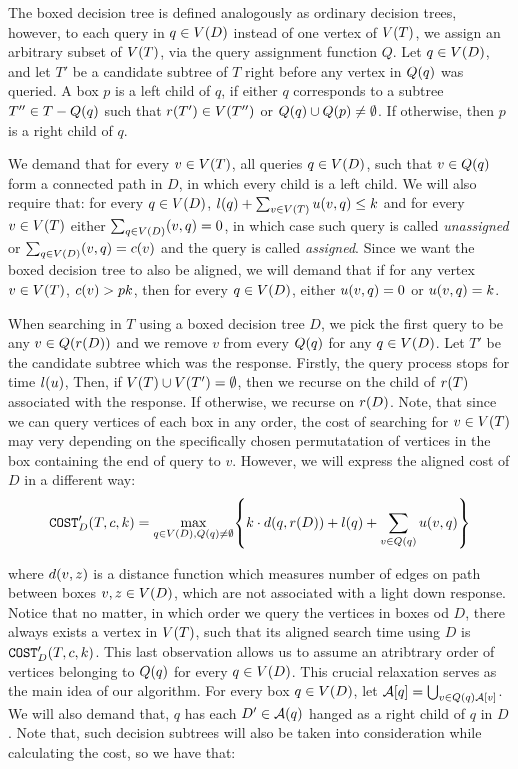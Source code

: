 The boxed decision tree is defined analogously as ordinary decision trees, however, to each query in $q\in V\mathopen{}\left( D \right)$ instead of one vertex of $V\mathopen{}\left( T \right)$, we assign an arbitrary subset of $V\mathopen{}\left( T \right)$, via the query assignment function $Q$. Let $q\in V\mathopen{}\left( D \right)$, and let $T'$ be a candidate subtree of $T$ right before any vertex in $Q\mathopen{}\left( q \right)$ was queried. A box $p$ is a left child of $q$, if either $q$ corresponds to a subtree $T''\in T-Q\mathopen{}\left( q \right)$ such that $r\mathopen{}\left( T' \right)\in V\mathopen{}\left( T'' \right)$ or $Q\mathopen{}\left( q \right)\cup Q\mathopen{}\left( p \right)\neq \emptyset$. If otherwise, then $p$ is a right child of $q$.

We demand that for every $v\in V\mathopen{}\left( T \right)$, all queries $q\in V\mathopen{}\left( D \right)$, such that $v\in Q\mathopen{}\left( q \right)$ form a connected path in $D$, in which every child is a left child. We will also require that: for every $q\in V\mathopen{}\left( D \right)$, $l\mathopen{}\left( q \right)+\sum_{v\in V\mathopen{}\left( T \right)}u\mathopen{}\left( v,q \right)\leq k$ and for every $v\in V\mathopen{}\left( T \right)$ either $\sum_{q\in V\mathopen{}\left( D \right)}\mathopen{}\left( v,q \right)=0$, in which case such query is called \textit{unassigned} or $\sum_{q\in V\mathopen{}\left( D \right)}\mathopen{}\left( v,q \right)=c\mathopen{}\left( v \right)$ and the query is called \textit{assigned}. Since we want the boxed decision tree to also be aligned, we will demand that if for any vertex $v\in V\mathopen{}\left( T \right)$, $c\mathopen{}\left( v \right)>pk$, then for every $q\in V\mathopen{}\left( D \right)$, either $u\mathopen{}\left( v,q \right)=0$ or $u\mathopen{}\left( v,q \right)=k$. 

When searching in $T$ using a boxed decision tree $D$, we pick the first query to be any $v\in Q\mathopen{}\left( r\mathopen{}\left( D \right) \right)$ and we remove $v$ from every $Q\mathopen{}\left( q \right)$ for any $q\in V\mathopen{}\left( D \right)$. Let $T'$ be the candidate subtree which was the response. Firstly, the query process stops for time $l\mathopen{}\left( u \right)$, Then, if $V\mathopen{}\left( T \right)\cup V\mathopen{}\left( T' \right) = \emptyset$, then we recurse on the child of $r\mathopen{}\left( T \right)$ associated with the response. If otherwise, we recurse on $r\mathopen{}\left( D \right)$. Note, that since we can query vertices of each box in any order, the cost of searching for $v\in V\mathopen{}\left( T \right)$ may very depending on the specifically chosen permutatation of vertices in the box containing the end of query to $v$. However, we will express the aligned cost of $D$ in a different way: 
$$
\texttt{COST}'_D\mathopen{}\left( T,c,k \right)= \max_{q\in V\mathopen{}\left( D \right), Q\mathopen{}\left( q \right)\neq \emptyset}\mathopen{}\left\{ k\cdot d\mathopen{}\left( q,r\mathopen{}\left( D \right) \right)+l\mathopen{}\left( q \right)+\sum_{v\in Q\mathopen{}\left( q \right)}u\mathopen{}\left( v,q \right) \right\}
$$

where $d\mathopen{}\left( v,z \right)$ is a distance function which measures number of edges on path between boxes $v,z \in V\mathopen{}\left( D \right)$, which are not associated with a light down response. Notice that no matter, in which order we query the vertices in boxes od $D$, there always exists a vertex in $V\mathopen{}\left( T \right)$, such that its aligned search time using $D$ is $\texttt{COST}'_D\mathopen{}\left( T,c,k \right)$. This last observation allows us to assume an atribtrary order of vertices belonging to $Q\mathopen{}\left( q \right)$ for every $q\in V\mathopen{}\left( D \right)$. This crucial relaxation serves as the main idea of our algorithm. For every box $q\in V\mathopen{}\left( D \right)$, let $\mathcal{A}[q]=\bigcup_{v\in Q\mathopen{}\left( q \right)\mathcal{A}[v]}$. We will also demand that, $q$ has each $D'\in \mathcal{A}\mathopen{}\left( q \right)$ hanged as a right child of $q$ in $D$. Note that, such decision subtrees will also be taken into consideration while calculating the cost, so we have that:

